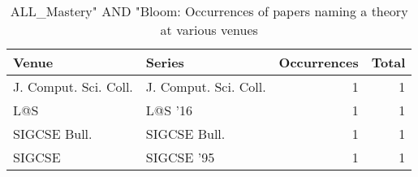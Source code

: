 \begin{table*}[t]
\begin{tabular}{llrr}
Venue & Series & Occurrences & Total\\\hline
\multirow{1}{*}{J. Comput. Sci. Coll.} & J. Comput. Sci. Coll. & 1 & \multirow{1}{*}{1}\\
\multirow{1}{*}{L@S } & L@S '16 & 1 & \multirow{1}{*}{1}\\
\multirow{1}{*}{SIGCSE Bull.} & SIGCSE Bull. & 1 & \multirow{1}{*}{1}\\
\multirow{1}{*}{SIGCSE } & SIGCSE '95 & 1 & \multirow{1}{*}{1}\\
\end{tabular}
\caption{ALL\_Mastery" AND "Bloom: Occurrences of papers naming a theory at various venues}
\end{table*}